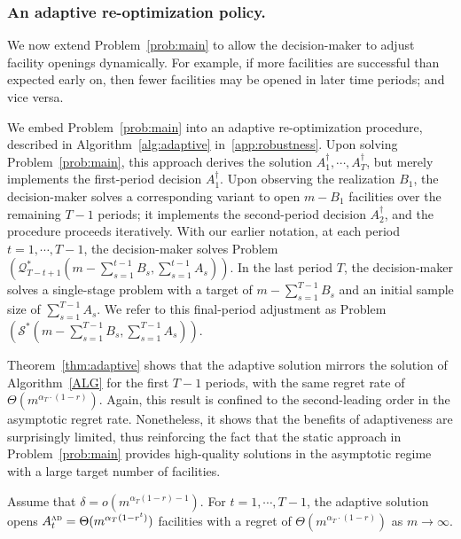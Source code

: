 \documentclass[nonblindrev]{informs3noheader}
\def\calQ{\mathcal{Q}}
\def\calS{\mathcal{S}}
\begin{document}
\subsubsection*{An adaptive re-optimization policy.}

We now extend Problem~\eqref{prob:main} to allow the decision-maker to adjust facility openings dynamically. For example, if more facilities are successful than expected early on, then fewer facilities may be opened in later time periods; and vice versa.

We embed Problem~\eqref{prob:main} into an adaptive re-optimization procedure, described in Algorithm~\ref{alg:adaptive} in~\ref{app:robustness}. Upon solving Problem~\eqref{prob:main}, this approach derives the solution $A^\dagger_1,\cdots,A^\dagger_T$, but merely implements the first-period decision $A^\dagger_1$. Upon observing the realization $B_1$, the decision-maker solves a corresponding variant to open $m-B_1$ facilities over the remaining $T-1$ periods; it implements the second-period decision $A^\dagger_2$, and the procedure proceeds iteratively. With our earlier notation, at each period $t=1,\cdots,T-1$, the decision-maker solves Problem~$\left(\calQ^*_{T-t+1}\left(m-\sum_{s=1}^{t-1}B_s,\sum_{s=1}^{t-1} A_s\right)\right)$. In the last period $T$, the decision-maker solves a single-stage problem with a target of $m-\sum_{s=1}^{T-1}B_s$ and an initial sample size of $\sum_{s=1}^{T-1}A_s$. We refer to this final-period adjustment as Problem~$\left(\calS^*\left(m-\sum_{s=1}^{T-1}B_s,\sum_{s=1}^{T-1} A_s\right)\right)$.

Theorem~\ref{thm:adaptive} shows that the adaptive solution mirrors the solution of Algorithm~\ref{ALG} for the first $T-1$ periods, with the same regret rate of $\Theta\left(m^{\alpha_T\cdot(1-r)}\right)$. Again, this result is confined to the second-leading order in the asymptotic regret rate. Nonetheless, it shows that the benefits of adaptiveness are surprisingly limited, thus reinforcing the fact that the static approach in Problem~\eqref{prob:main} provides high-quality solutions in the asymptotic regime with a large target number of facilities.

\begin{theorem}\label{thm:adaptive}
	Assume that $\delta = o(m^{\alpha_T(1-r)-1})$. For $t=1,\cdots,T-1$, the adaptive solution opens $A^{\textsc{ad}}_t=\Theta(m^{\alpha_T(1-r^t)})$ facilities with a regret of $\Theta\left(m^{\alpha_T\cdot(1-r)}\right)$ as $m \to \infty$.
\end{theorem}
\end{document}
